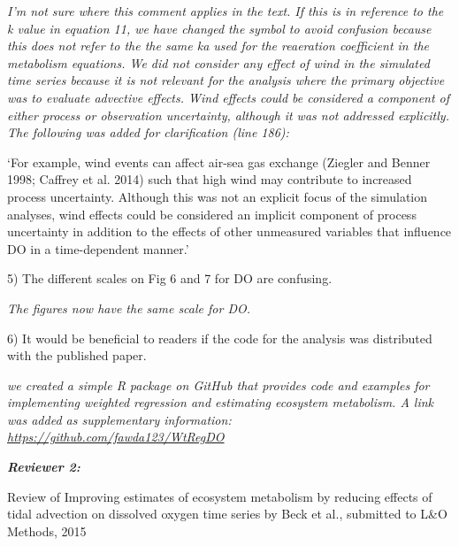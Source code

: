 \documentclass[letterpaper,12pt]{article}\usepackage[]{graphicx}\usepackage[]{color}
\newcommand{\Bigtxt}[1]{\textbf{\textit{#1}}}
\begin{document}
{\it I'm not sure where this comment applies in the text.  If this is in reference to the k value in equation 11, we have changed the symbol to avoid confusion because this does not refer to the the same ka used for the reaeration coefficient in the metabolism equations.  We did not consider any effect of wind in the simulated time series because it is not relevant for the analysis where the primary objective was to evaluate advective effects.  Wind effects could be considered a component of either process or observation uncertainty, although it was not addressed explicitly.  The following was added for clarification (line 186):

`For example, wind events can affect air-sea gas exchange (Ziegler and Benner 1998; Caffrey et al. 2014) such that high wind may contribute to increased process uncertainty.  Although this was not an explicit focus of the simulation analyses, wind effects could be considered an implicit component of process uncertainty in addition to the effects of other unmeasured variables that influence DO in a time-dependent manner.'
}

5) The different scales on Fig 6 and 7 for DO are confusing. 

{\it The figures now have the same scale for DO.}

6) It would be beneficial to readers if the code for the analysis was distributed with the published paper.

{\it we created a simple R package on GitHub that provides code and examples for implementing weighted regression and estimating ecosystem metabolism. A link was added as supplementary information: \href{https://github.com/fawda123/WtRegDO}{https://github.com/fawda123/WtRegDO}}  

\Bigtxt{Reviewer 2:}

Review of Improving estimates of ecosystem metabolism by reducing effects of tidal advection on dissolved oxygen time series by Beck et al., submitted to L\&O Methods, 2015
\end{document}
